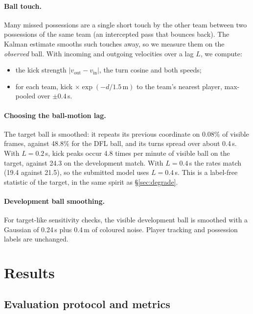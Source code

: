 \documentclass[10pt,a4paper,twocolumn]{article}
\begin{document}
\paragraph{Ball touch.} Many missed possessions are a single short touch by the other team between
two possessions of the same team (an intercepted pass that bounces back). The Kalman estimate
smooths such touches away, so we measure them on the \emph{observed} ball. With incoming and
outgoing velocities over a lag $L$, we compute:
\begin{itemize}
  \item the kick strength $\lvert v_{\text{out}} - v_{\text{in}}\rvert$, the turn cosine and both
        speeds;
  \item for each team, kick $\times \exp(-d/1.5\,\mathrm m)$ to the team's nearest player,
        max-pooled over $\pm0.4$\,s.
\end{itemize}

\paragraph{Choosing the ball-motion lag.} The target ball is smoothed: it repeats its previous
coordinate on 0.08\% of visible frames, against 48.8\% for the DFL ball, and its turns spread over
about 0.4\,s. With $L = 0.2$\,s, kick peaks occur 4.8 times per minute of visible ball on the
target, against 24.3 on the development match. With $L = 0.4$\,s the rates match (19.4 against
21.5), so the submitted model uses $L = 0.4$\,s. This is a label-free statistic of the target, in
the same spirit as \S\ref{sec:degrade}.

\paragraph{Development ball smoothing.} For target-like sensitivity checks, the visible
development ball is smoothed with a Gaussian of 0.24\,s plus 0.4\,m of coloured noise. Player
tracking and possession labels are unchanged.

\section{Results}

\subsection{Evaluation protocol and metrics}\label{sec:evaluation}
\end{document}
